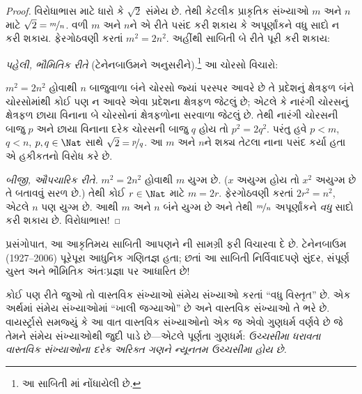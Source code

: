 \begin{proof}
વિરોધાભાસ માટે ધારો કે $\sqrt{2}$ સંમેય છે. તેથી કેટલીક પ્રાકૃતિક
સંખ્યાઓ $m$ અને $n$ માટે $\sqrt{2} = \nicefrac{m}{n}$. વળી $m$ અને
$n$ને એ રીતે પસંદ કરી શકાય કે અપૂર્ણાંકને વધુ સાદો ન કરી શકાય.
ફેરગોઠવણી કરતાં $m^{2} = 2n^{2}$. અહીંથી સાબિતી બે રીતે પૂરી કરી શકાય:

\emph{પહેલી, ભૌમિતિક રીતે} (ટેનેનબાઉમને અનુસરીને).\footnote{આ સાબિતી
\cite{Conway2006}માં નોંધાયેલી છે.} આ ચોરસો વિચારો:
\begin{center}
\end{center}
$m^2 = 2n^2$ હોવાથી $n$ બાજુવાળા બંને ચોરસો જ્યાં પરસ્પર આવરે છે
તે પ્રદેશનું ક્ષેત્રફળ બંને ચોરસોમાંથી કોઈ પણ ન આવરે એવા પ્રદેશના
ક્ષેત્રફળ જેટલું છે; એટલે કે નારંગી ચોરસનું ક્ષેત્રફળ છાયા વિનાના બે
ચોરસોનાં ક્ષેત્રફળોના સરવાળા જેટલું છે. તેથી નારંગી ચોરસની બાજુ $p$
અને છાયા વિનાના દરેક ચોરસની બાજુ $q$ હોય તો $p^2 = 2q^2$. પરંતુ હવે
$p < m$, $q < n$, $p, q \in \Nat$ સાથે
$\sqrt{2} = \nicefrac{p}{q}$. આ $m$ અને $n$ને શક્ય તેટલા નાના પસંદ
કર્યા હતા એ હકીકતનો વિરોધ કરે છે.

\emph{બીજી, ઔપચારિક રીતે.} $m^{2} = 2n^{2}$ હોવાથી $m$ યુગ્મ છે.
($x$ અયુગ્મ હોય તો $x^2$ અયુગ્મ છે તે બતાવવું સરળ છે.) તેથી કોઈ
$r \in \Nat$ માટે $m = 2r$. ફેરગોઠવણી કરતાં $2r^2 = n^2$,
એટલે $n$ પણ યુગ્મ છે. આથી $m$ અને $n$ બંને યુગ્મ છે અને તેથી
$\nicefrac{m}{n}$ અપૂર્ણાંકને \emph{વધુ} સાદો કરી શકાય છે.
વિરોધાભાસ!
\end{proof}

પ્રસંગોપાત, આ આકૃતિમય સાબિતી આપણને ની
સામગ્રી ફરી વિચારવા દે છે. ટેનેનબાઉમ (1927--2006) પૂરેપૂરા આધુનિક
ગણિતજ્ઞ હતા; છતાં આ સાબિતી નિર્વિવાદપણે સુંદર, સંપૂર્ણ ચુસ્ત અને
ભૌમિતિક અંતઃપ્રજ્ઞા પર આધારિત છે!

કોઈ પણ રીતે જુઓ તો વાસ્તવિક સંખ્યાઓ સંમેય સંખ્યાઓ કરતાં ``વધુ
વિસ્તૃત'' છે. એક અર્થમાં સંમેય સંખ્યાઓમાં ``ખાલી જગ્યાઓ'' છે અને
વાસ્તવિક સંખ્યાઓ તે ભરે છે. વાયર્સ્ટ્રાસે સમજ્યું કે આ વાત વાસ્તવિક
સંખ્યાઓનો એક જ એવો ગુણધર્મ વર્ણવે છે જે તેમને સંમેય સંખ્યાઓથી જુદી
પાડે છે—એટલે પૂર્ણતા ગુણધર્મ: \emph{ઉચ્ચસીમા ધરાવતા વાસ્તવિક
સંખ્યાઓના દરેક અરિક્ત ગણને ન્યૂનતમ ઉચ્ચસીમા હોય છે.}


